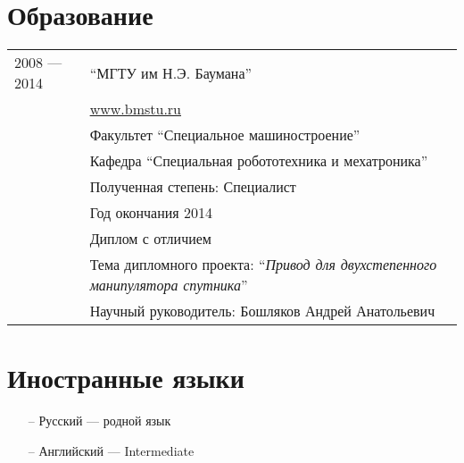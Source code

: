 \documentclass[a4paper, 10pt]{article}
\begin{document}
\section{Образование}
\begin{longtable}{p{20mm}|p{140mm}}
2008 --- 2014
& ``МГТУ им Н.Э. Баумана'' \\
& \href{http://www.bmstu.ru}{www.bmstu.ru} \\
& Факультет ``Специальное машиностроение'' \\
& Кафедра ``Специальная робототехника и мехатроника'' \\
& Полученная степень: Специалист \\
& Год окончания 2014 \\
& Диплом с отличием \\
& Тема дипломного проекта: ``\textit{Привод для двухстепенного манипулятора спутника}'' \\
& Научный руководитель: Бошляков Андрей Анатольевич \\
\end{longtable}


\section{Иностранные языки}
\begin{itemize}
    \item[--] Русский    --- родной язык
    \item[--] Английский --- Intermediate
\end{itemize}
\end{document}
